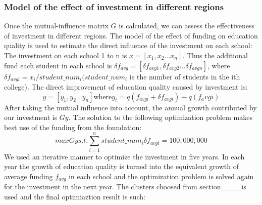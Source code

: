 \subsubsection{Model of the effect of investment in different regions}
Once the mutual-influence matrix $G$ is calculated, we can assess the effectiveness of investment in different regions. The model of the effect of funding on education quality is used to estimate the direct influence of the investment on each school:
The investment on each school 1 to n is $x=[x_{1}, x_{2} \ldots x_{n}]$. Thus the additional fund each student in each school is $\delta f_{avg}=[\delta f_{avg1}, \delta f_{avg2} \ldots \delta f_{avgn}]$, where $\delta f_{avgi} = x_{i} / student\_num_{i} (student\_num_{i}$ is the number of students in the ith college).
The direct improvement of education quality caused by investment is:
$$y = [y_{1}, y_{2} \ldots y_{n}] \mbox{where} y_{i} = q(f_{avgi} + \delta f_{avgi}) - q(f_avg{i})$$
After taking the mutual influence into account, the annual growth contributed by our investment is $Gy$. The solution to the following optimization problem makes best use of the funding from the foundation:
$$max Gy
s.t. \sum\limits_{i=1}^n student\_num_{i} \delta f_{avgi} = 100,000,000$$
We used an iterative manner to optimize the investment in five years. In each year the growth of education quality is turned into the equivalent growth of average funding $f_{avg}$ in each school and the optimization problem is solved again for the investment in the next year.
The clusters choosed from section ___ is used and the final optimiaztion result is such:


